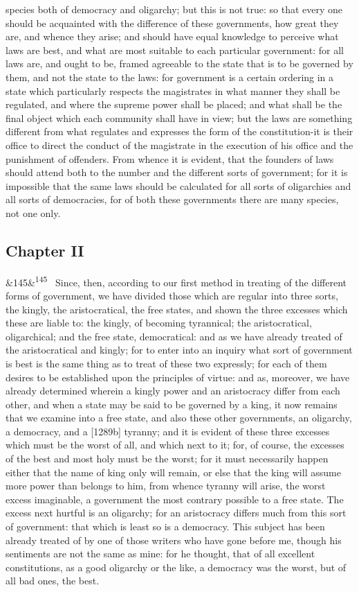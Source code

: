 \documentclass[12pt]{article}
\newcommand{\para}[1][]{\par\noindent\ifx&#1&\else\textsuperscript{\footnotesize #1}~\fi}
\begin{document}
species both of democracy and oligarchy; but this is not true: so that every one should be acquainted with the difference of these governments, how great they are, and whence they arise; and should have equal knowledge to perceive what laws are best, and what are most suitable to each particular government: for all laws are, and ought to be, framed agreeable to the state that is to be governed by them, and not the state to the laws: for government is a certain ordering in a state which particularly respects the magistrates in what manner they shall be regulated, and where the supreme power shall be placed; and what shall be the final object which each community shall have in view; but the laws are something different from what regulates and expresses the form of the constitution-it is their office to direct the conduct of the magistrate in the execution of his office and the punishment of offenders. From whence it is evident, that the founders of laws should attend both to the number and the different sorts of government; for it is impossible that the same laws should be calculated for all sorts of oligarchies and all sorts of democracies, for of both these governments there are many species, not one only.

\subsection*{Chapter II}

\para[145] Since, then, according to our first method in treating of the different forms of government, we have divided those which are regular into three sorts, the kingly, the aristocratical, the free states, and shown the three excesses which these are liable to: the kingly, of becoming tyrannical; the aristocratical, oligarchical; and the free state, democratical: and as we have already treated of the aristocratical and kingly; for to enter into an inquiry what sort of government is best is the same thing as to treat of these two expressly; for each of them desires to be established upon the principles of virtue: and as, moreover, we have already determined wherein a kingly power and an aristocracy differ from each other, and when a state may be said to be governed by a king, it now remains that we examine into a free state, and also these other governments, an oligarchy, a democracy, and a [1289b] tyranny; and it is evident of these three excesses which must be the worst of all, and which next to it; for, of course, the excesses of the best and most holy must be the worst; for it must necessarily happen either that the name of king only will remain, or else that the king will assume more power than belongs to him, from whence tyranny will arise, the worst excess imaginable, a government the most contrary possible to a free state. The excess next hurtful is an oligarchy; for an aristocracy differs much from this sort of government: that which is least so is a democracy. This subject has been already treated of by one of those writers who have gone before me, though his sentiments are not the same as mine: for he thought, that of all excellent constitutions, as a good oligarchy or the like, a democracy was the worst, but of all bad ones, the best.
\end{document}
